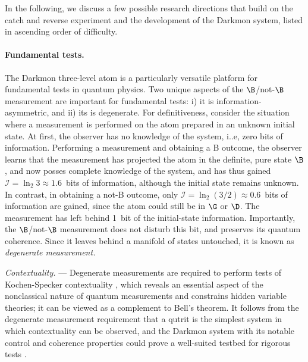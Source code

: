 In the following, we discuss a few possible research directions that
build on the catch and reverse experiment and the development of the
Darkmon system, listed in ascending order of difficulty. 

\paragraph{Fundamental tests. }

The Darkmon three-level atom is a particularly versatile platform
for fundamental tests in quantum physics. Two unique aspects of the
$\B$/not-$\B$ measurement are important for fundamental tests: i)
it is information-asymmetric, and ii) its is degenerate. For definitiveness,
consider the situation where a measurement is performed on the atom
prepared in an unknown initial state. At first, the observer has no
knowledge of the system, i..e, zero bits of information. Performing
a measurement and obtaining a B outcome, the observer learns that
the measurement has projected the atom in the definite, pure state
$\B$, and now posses complete knowledge of the system, and has thus
gained $\mathcal{I}=\ln_{2}3\approx1.6$~bits of information, although
the initial state  remains unknown. In contrast, in obtaining a not-B
outcome, only $\mathcal{I}=\ln_{2}\left(3/2\right)\approx0.6$~bits
of information are gained, since the atom could still be in $\G$
or $\D$. The measurement has left behind 1~bit of the initial-state
information. Importantly, the $\B$/not-$\B$ measurement does not
disturb this bit, and preserves its quantum coherence. Since it leaves
behind a manifold of states untouched, it is known as \emph{degenerate
measurement.}

\emph{Contextuality.} — Degenerate measurements  are required to
perform tests of Kochen-Specker contextuality \citep{KochenSpecker1967},
which reveals an essential aspect of the nonclassical nature of quantum
measurements and constrains hidden variable theories; it can be viewed
as a complement to Bell's theorem. It follows from the degenerate
measurement requirement that a qutrit is the simplest system in which
contextuality can be observed, and the Darkmon system with its notable
control and coherence properties could prove a well-suited testbed
for rigorous tests \citep{Mermin1993-rev,Klyachko2008,Yu2012,Szangolies2015-book}.


